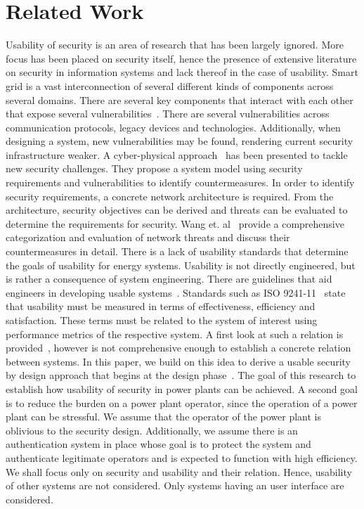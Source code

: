 \section{Related Work}
Usability of security is an area of research that has been largely ignored. More focus has been placed on security itself, hence the presence of extensive literature on security in information systems and lack thereof in the case of usability. Smart grid is a vast interconnection of several different kinds of components across several domains. There are several key components that interact with each other that expose several vulnerabilities~\cite{liu2012cyber}. There are several vulnerabilities across communication protocols, legacy devices and technologies. Additionally, when designing a system, new vulnerabilities may be found, rendering current security infrastructure weaker. A cyber-physical approach~\cite{mo2012cyber} has been presented to tackle new security challenges. They propose a system model using security requirements and vulnerabilities to identify countermeasures. In order to identify security requirements, a concrete network architecture is required. From the architecture, security objectives can be derived and threats can be evaluated to determine the requirements for security. Wang et. al~\cite{wang2013cyber} provide a comprehensive categorization and evaluation of network threats and discuss their countermeasures in detail.
\newline 
There is a lack of usability standards that determine the goals of usability for energy systems. Usability is not directly engineered, but is rather a consequence of system engineering. There are guidelines that aid engineers in developing usable systems~\cite{nurse2011guidelines}. Standards such as ISO 9241-11~\cite{bevan2015iso} state that usability must be measured in terms of effectiveness, efficiency and satisfaction. These terms must be related to the system of interest using performance metrics of the respective system. A first look at such a relation is provided~\cite{kainda2010security}, however is not comprehensive enough to establish a concrete relation between systems. In this paper, we build on this idea to derive a usable security by design approach that begins at the design phase~\cite{nielsen1992usability}. The goal of this research to establish how usability of security in power plants can be achieved. A second goal is to reduce the burden on a power plant operator, since the operation of a power plant can be stressful. We assume that the operator of the power plant is oblivious to the security design. Additionally, we assume there is an authentication system in place whose goal is to protect the system and authenticate legitimate operators and is expected to function with high efficiency. We shall focus only on security and usability and their relation. Hence, usability of other systems are not considered. Only systems having an user interface are considered.

